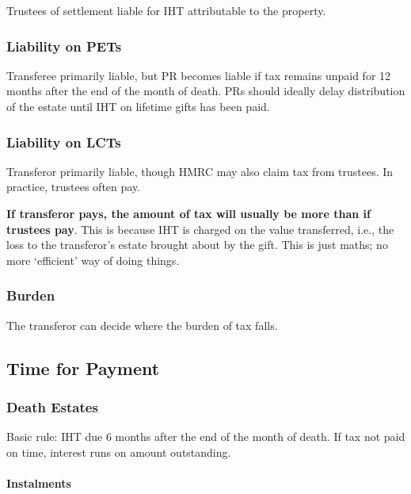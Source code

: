 \documentclass[
]{article}
\begin{document}
Trustees of settlement liable for IHT attributable to the property.

\hypertarget{liability-on-pets}{%
\subsubsection{Liability on PETs}\label{liability-on-pets}}

Transferee primarily liable, but PR becomes liable if tax remains unpaid
for 12 months after the end of the month of death. PRs should ideally
delay distribution of the estate until IHT on lifetime gifts has been
paid.

\hypertarget{liability-on-lcts}{%
\subsubsection{Liability on LCTs}\label{liability-on-lcts}}

Transferor primarily liable, though HMRC may also claim tax from
trustees. In practice, trustees often pay.

\textbf{If transferor pays, the amount of tax will usually be more than
if trustees pay}. This is because IHT is charged on the value
transferred, i.e., the loss to the transferor's estate brought about by
the gift. This is just maths; no more `efficient' way of doing things.

\hypertarget{burden}{%
\subsubsection{Burden}\label{burden}}

The transferor can decide where the burden of tax falls.

\hypertarget{time-for-payment}{%
\subsection{Time for Payment}\label{time-for-payment}}

\hypertarget{death-estates}{%
\subsubsection{Death Estates}\label{death-estates}}

Basic rule: IHT due 6 months after the end of the month of death. If tax
not paid on time, interest runs on amount outstanding.

\hypertarget{instalments}{%
\paragraph{Instalments}\label{instalments}}
\end{document}
